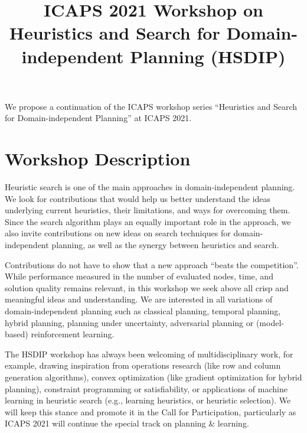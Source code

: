 \documentclass[10pt]{article}
\begin{document}
\title{ICAPS 2021 Workshop on Heuristics and Search for Domain-independent
Planning (HSDIP)%
}
\date{}

\author{}

\maketitle

\vspace{-2cm}


We propose a continuation of the ICAPS workshop series ``Heuristics
and Search for Domain-independent Planning'' at ICAPS 2021.

\section*{Workshop Description}
Heuristic search is one of the main approaches in domain-independent
planning.  We look for contributions that would help us better
understand the ideas underlying current heuristics, their limitations,
and ways for overcoming them.
%
Since the search algorithm plays an equally important role in the
approach, we also invite contributions on new ideas on search
techniques for domain-independent planning, as well as the synergy
between heuristics and search.

Contributions do not have to show that a new approach ``beats the competition''.
While performance measured in the number of evaluated nodes, time, and solution
quality remains relevant, in this workshop we seek above all crisp and
meaningful ideas and understanding.
%
We are interested in all variations of domain-independent planning
such as classical planning, temporal planning, hybrid planning, planning under
uncertainty, adversarial planning or (model-based) reinforcement learning.

The HSDIP workshop has always been welcoming of multidisciplinary work,
for example, drawing inspiration from operations research (like row and
column generation algorithms), convex optimization (like gradient
optimization for hybrid planning), constraint programming or
satisfiability, or applications of machine learning in heuristic search
(e.g., learning heuristics, or heuristic selection). We will keep this
stance and promote it in the Call for Participation, particularly as ICAPS 2021
will continue the special track on planning \& learning.
\end{document}
